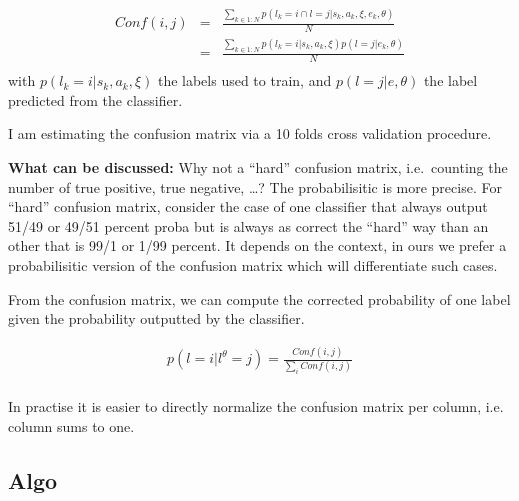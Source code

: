 \begin{eqnarray}
Conf(i,j) &=& \frac{\sum_{k \in 1:N} p(l_k = i \cap l = j| s_k, a_k, \xi, e_k, \theta)}{N} \nonumber \\
&=& \frac{\sum_{k \in 1:N} p(l_k = i| s_k, a_k, \xi) p(l = j| e_k, \theta)}{N} \nonumber \\
\end{eqnarray}
with $p(l_k = i| s_k, a_k, \xi)$ the labels used to train, and $p(l = j| e, \theta)$ the label predicted from the classifier.

I am estimating the confusion matrix via a 10 folds cross validation procedure.

\textbf{What can be discussed:} Why not a ``hard'' confusion matrix, i.e.\ counting the number of true positive, true negative, \ldots ? The probabilisitic is more precise. For ``hard'' confusion matrix, consider the case of one classifier that always output 51/49 or 49/51 percent proba but is always as correct the ``hard'' way than an other that is 99/1 or 1/99 percent. It depends on the context, in ours we prefer a probabilisitic version of the confusion matrix which will differentiate such cases.

From the confusion matrix, we can compute the corrected probability of one label given the probability outputted by the classifier.

\begin{eqnarray}
p(l = i | l^\theta = j)  = \frac{Conf(i,j)}{\sum_i Conf(i,j)} \nonumber \\
\end{eqnarray}

In practise it is easier to directly normalize the confusion matrix per column, i.e. column sums to one.

\subsection{Algo}



